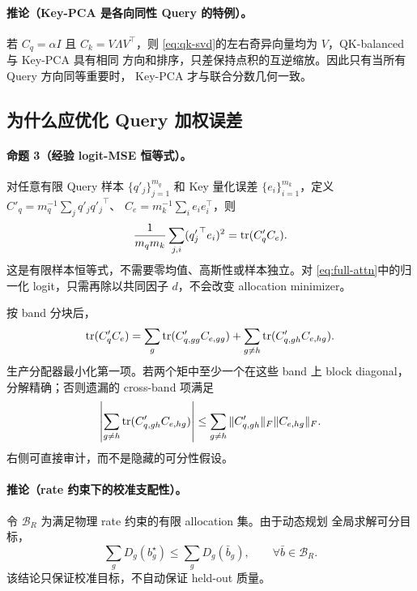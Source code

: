 \paragraph{推论（Key-PCA 是各向同性 Query 的特例）。}
若 $C_q=\alpha I$ 且 $C_k=V\Lambda V^\top$，则
\cref{eq:qk-svd}的左右奇异向量均为 $V$，QK-balanced 与 Key-PCA 具有相同
方向和排序，只差保持点积的互逆缩放。因此只有当所有 Query 方向同等重要时，
Key-PCA 才与联合分数几何一致。

\subsection{为什么应优化 Query 加权误差}

\paragraph{命题 3（经验 logit-MSE 恒等式）。}
对任意有限 Query 样本 $\{q'_j\}_{j=1}^{m_q}$ 和 Key 量化误差
$\{e_i\}_{i=1}^{m_k}$，定义
$C'_q=m_q^{-1}\sum_jq'_j{q'_j}^\top$、
$C_e=m_k^{-1}\sum_ie_ie_i^\top$，则
\begin{equation}
 \frac{1}{m_qm_k}\sum_{j,i}({q'_j}^\top e_i)^2
 =\operatorname{tr}(C'_qC_e).
 \label{eq:trace-qmse}
\end{equation}
这是有限样本恒等式，不需要零均值、高斯性或样本独立。对
\cref{eq:full-attn}中的归一化 logit，只需再除以共同因子 $d$，不会改变
allocation minimizer。

按 band 分块后，
\begin{equation}
 \operatorname{tr}(C'_qC_e)=
 \sum_g\operatorname{tr}(C'_{q,gg}C_{e,gg})
 +\sum_{g\ne h}\operatorname{tr}(C'_{q,gh}C_{e,hg}).
 \label{eq:block-qmse}
\end{equation}
生产分配器最小化第一项。若两个矩中至少一个在这些 band 上 block diagonal，
分解精确；否则遗漏的 cross-band 项满足
\begin{equation}
 \left|\sum_{g\ne h}\operatorname{tr}(C'_{q,gh}C_{e,hg})\right|
 \le\sum_{g\ne h}
 \|C'_{q,gh}\|_F\|C_{e,hg}\|_F.
 \label{eq:cross-band-bound}
\end{equation}
右侧可直接审计，而不是隐藏的可分性假设。

\paragraph{推论（rate 约束下的校准支配性）。}
令 $\mathcal B_R$ 为满足物理 rate 约束的有限 allocation 集。由于动态规划
全局求解可分目标，
\begin{equation}
 \sum_gD_g(b_g^\star)\le\sum_gD_g(\bar b_g),
 \qquad \forall\bar b\in\mathcal B_R.
 \label{eq:allocation-dominance}
\end{equation}
该结论只保证校准目标，不自动保证 held-out 质量。

